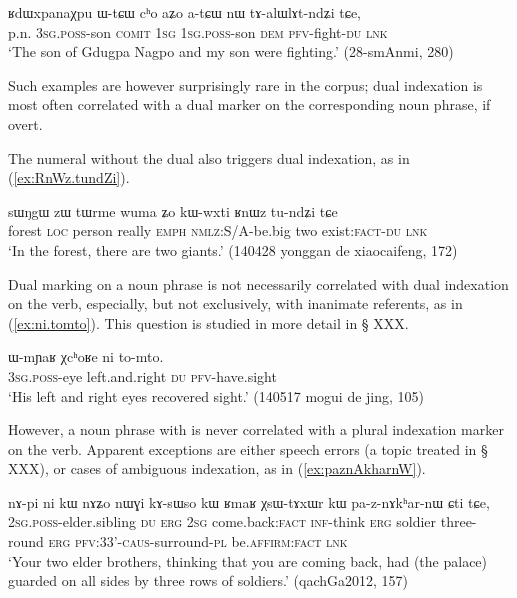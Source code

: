 \begin{exe}
\ex \label{ex:nW.talWlAtndZi}
\gll  ʁdɯxpanaχpu ɯ-tɕɯ cʰo aʑo a-tɕɯ nɯ tɤ-alɯlɤt-ndʑi tɕe, \\
p.n. \textsc{3sg}.\textsc{poss}-son \textsc{comit} \textsc{1sg} \textsc{1sg}.\textsc{poss}-son \textsc{dem} \textsc{pfv}-fight-\textsc{du} \textsc{lnk} \\
\glt `The son of Gdugpa Nagpo and my son were fighting.' (28-smAnmi, 280)
\end{exe}

Such examples are however surprisingly rare in the corpus; dual indexation is most often correlated with a dual marker on the corresponding noun phrase, if overt.

The numeral  without the dual also triggers dual indexation, as in (\ref{ex:RnWz.tundZi}).

\begin{exe}
\ex \label{ex:RnWz.tundZi}
\gll   sɯŋgɯ zɯ tɯrme wuma ʑo kɯ-wxti ʁnɯz tu-ndʑi tɕe\\
forest \textsc{loc} person really \textsc{emph} \textsc{nmlz}:S/A-be.big two exist:\textsc{fact}-\textsc{du} \textsc{lnk}\\
\glt `In the forest, there are two giants.'  (140428 yonggan de xiaocaifeng, 172)
\end{exe}

Dual marking on a noun phrase is not necessarily correlated with dual indexation on the verb, especially, but not exclusively, with inanimate referents, as in (\ref{ex:ni.tomto}). This question is studied in more detail in § XXX.

\begin{exe}
\ex \label{ex:ni.tomto}
\gll  ɯ-mɲaʁ χcʰoʁe ni to-mto. \\
\textsc{3sg}.\textsc{poss}-eye left.and.right \textsc{du} \textsc{pfv}-have.sight \\
\glt `His left and right eyes recovered sight.' (140517 mogui de jing, 105)
\end{exe}

However, a noun phrase with  is never correlated with a plural indexation marker on the verb. Apparent exceptions are either speech errors (a topic treated in § XXX), or cases of ambiguous indexation, as in (\ref{ex:paznAkharnW}).

\begin{exe}
\ex \label{ex:paznAkharnW}
 \gll  nɤ-pi ni kɯ nɤʑo nɯɣi kɤ-sɯso kɯ ʁmaʁ χsɯ-tɤxɯr kɯ pa-z-nɤkʰar-nɯ ɕti tɕe, \\
 \textsc{2sg}.\textsc{poss}-elder.sibling \textsc{du} \textsc{erg} \textsc{2sg} come.back:\textsc{fact} \textsc{inf}-think \textsc{erg} soldier three-round \textsc{erg} \textsc{pfv}:3\fl{}3'-\textsc{caus}-surround-\textsc{pl} be.\textsc{affirm}:\textsc{fact} \textsc{lnk} \\
 \glt `Your two elder brothers, thinking that you are coming back, had (the palace) guarded on all sides by three rows of soldiers.' (qachGa2012, 157)
\end{exe}

